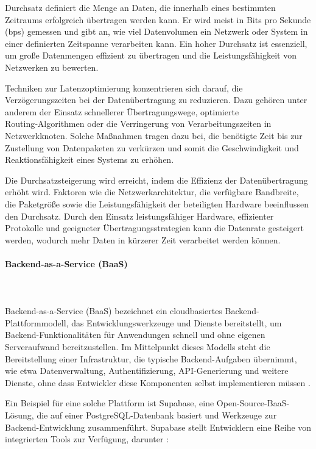 Durchsatz definiert die Menge an Daten, die innerhalb eines bestimmten Zeitraums erfolgreich übertragen werden kann. Er wird meist in Bits pro Sekunde (bps) gemessen und gibt an, wie viel Datenvolumen ein Netzwerk oder System in einer definierten Zeitspanne verarbeiten kann. Ein hoher Durchsatz ist essenziell, um große Datenmengen effizient zu übertragen und die Leistungsfähigkeit von Netzwerken zu bewerten.\cite{studysmarter_latenz_durchsatz}

Techniken zur Latenzoptimierung konzentrieren sich darauf, die Verzögerungszeiten bei der Datenübertragung zu reduzieren. Dazu gehören unter anderem der Einsatz schnellerer Übertragungswege, optimierte Routing‑Algorithmen oder die Verringerung von Verarbeitungszeiten in Netzwerkknoten. Solche Maßnahmen tragen dazu bei, die benötigte Zeit bis zur Zustellung von Datenpaketen zu verkürzen und somit die Geschwindigkeit und Reaktionsfähigkeit eines Systems zu erhöhen.\cite{studysmarter_latenz_durchsatz}

Die Durchsatzsteigerung wird erreicht, indem die Effizienz der Datenübertragung erhöht wird. Faktoren wie die Netzwerkarchitektur, die verfügbare Bandbreite, die Paketgröße sowie die Leistungsfähigkeit der beteiligten Hardware beeinflussen den Durchsatz. Durch den Einsatz leistungsfähiger Hardware, effizienter Protokolle und geeigneter Übertragungsstrategien kann die Datenrate gesteigert werden, wodurch mehr Daten in kürzerer Zeit verarbeitet werden können.\cite{studysmarter_latenz_durchsatz}

\paragraph{Backend-as-a-Service (BaaS)}
\mbox{}\\
\mbox{}\\
Backend-as-a-Service (BaaS) bezeichnet ein cloudbasiertes Backend-Plattformmodell, das Entwicklungswerkzeuge und Dienste bereitstellt, um Backend-Funktionalitäten für Anwendungen schnell und ohne eigenen Serveraufwand bereitzustellen. Im Mittelpunkt dieses Modells steht die Bereitstellung einer Infrastruktur, die typische Backend-Aufgaben übernimmt, wie etwa Datenverwaltung, Authentifizierung, API-Generierung und weitere Dienste, ohne dass Entwickler diese Komponenten selbst implementieren müssen \cite{supabase_overview_chauhan}.

Ein Beispiel für eine solche Plattform ist Supabase, eine Open-Source-BaaS-Lösung, die auf einer PostgreSQL-Datenbank basiert und Werkzeuge zur Backend-Entwicklung zusammenführt. Supabase stellt Entwicklern eine Reihe von integrierten Tools zur Verfügung, darunter \cite{supabase_overview_chauhan}:

